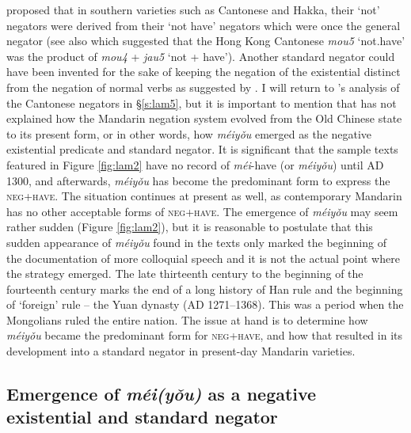 \documentclass[output=paper]{langscibook}
\begin{document}
\citeauthor{Zhang2002} proposed that in southern varieties such as Cantonese and Hakka, their `not' negators were derived from their `not have' negators which were once the general negator (see also \citealt{Law2014} which suggested that the Hong Kong Cantonese \textit{mou5} `not.have' was the product of \textit{mou4} + \textit{jau5} `not + have'). Another standard negator could have been invented for the sake of keeping the negation of the existential distinct from the negation of normal verbs as suggested by \citet{Veselinova2016}. I will return to \citeauthor{Zhang2002}'s analysis of the Cantonese negators in §\ref{s:lam5}, but it is important to mention that \citeauthor{Zhang2002} has not explained how the Mandarin negation system evolved from the Old Chinese state to its present form, or in other words, how \textit{méiyǒu} emerged as the negative existential predicate and standard negator. It is significant that the sample texts featured in Figure \ref{fig:lam2} have no record of \textit{méi}-have (or \textit{méiyǒu}) until AD 1300, and afterwards, \textit{méiyǒu} has become the predominant form to express the \textsc{neg}+\textsc{have}. The situation continues at present as well, as contemporary Mandarin has no other acceptable forms of \textsc{neg}+\textsc{have}. The emergence of \textit{méiyǒu} may seem rather sudden (Figure \ref{fig:lam2}), but it is reasonable to postulate that this sudden appearance of \textit{méiyǒu} found in the texts only marked the beginning of the documentation of more colloquial speech and it is not the actual point where the strategy emerged. The late thirteenth century to the beginning of the fourteenth century marks the end of a long history of Han rule and the beginning of `foreign' rule – the Yuan dynasty (AD 1271–1368). This was a period when the Mongolians ruled the entire nation. The issue at hand is to determine how \textit{méiyǒu} became the predominant form for \textsc{neg}+\textsc{have}, and how that resulted in its development into a standard negator in present-day Mandarin varieties. 



\subsection{Emergence of \textit{méi(yǒu)} as a negative existential and standard negator}\label{s:lam4-2}
\end{document}
